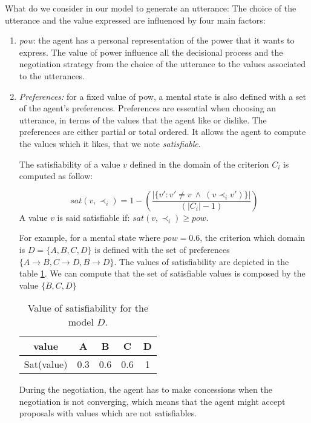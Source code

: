 \documentclass{llncs}
\begin{document}
	What do we consider in our model to generate an utterance: 
	The choice of the utterance and the value expressed are influenced by four main factors:
	\begin{enumerate}
		\item \emph{pow}: the agent has a personal representation of the power that it wants to express. The value of power influence all the decisional process and the negotiation strategy from the choice of the utterance to the values associated to the utterances.
		
		\item \emph{Preferences:} for a fixed value of pow, a mental state is also defined with a set of the agent's preferences. 
		Preferences are essential when choosing an utterance, in terms of the values that the agent like or dislike. The preferences are either partial or total ordered. 
		It allows the agent to compute the values which it likes, that we note \textit{satisfiable}.
		
		The satisfiability of a value $v$ defined in the domain of the criterion $C_i$ is computed as follow: 
		
			\begin{equation}
			sat(v, \prec_i) =	1 - \left( \frac{|\{v' : v' \neq v \  \wedge \ (v \prec_i v')\}| }{( |C_i| - 1 )}\right)
			\end{equation}
		A value $v$ is said satisfiable if:
		 	$sat(v, \prec_i) \geq pow$.
		
		
		\par For example, for  a mental state where $pow =0.6$, the criterion which domain is  $D =\{A, B, C, D\}$ is defined with the set of preferences $\{A \rightarrow  B, C \rightarrow  D , B \rightarrow D \}$. The values of satisfiability are depicted in the table \ref{sat}. We can compute that the set of satisfiable values is composed by the value $\{B, C, D\}$ 
			 \begin{table}
			 	\centering
			 	\begin{tabular}{ |c|c|c|c|c| }
			 		\hline				
			 		value & A & B & C & D \\
			 		\hline

			 		\hline
			 		Sat(value) & 0.3 & 0.6 & 0.6 & 1 \\
			 		\hline
			 		
			 	\end{tabular}
			 	\caption{Value of satisfiability for the model $D$.}
			 	\label{sat}
			 \end{table}
		
		\par During the negotiation, the agent has to make concessions when the negotiation is not converging, which means that the agent might accept proposals with values which are not satisfiables.
	\end{enumerate}
	
\end{document}
